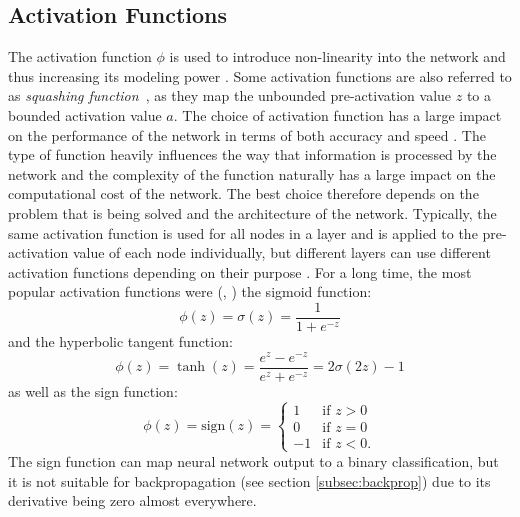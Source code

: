 \subsection{Activation Functions}
\label{subsec:activation-functions}
The activation function $\phi$ is used to introduce non-linearity into the network and thus increasing its modeling power \cite[section 1.2.1.3]{aggarwal_neural_2018}. 
Some activation functions are also referred to as \textit{squashing function}~\cite[10]{haykin_neural_1998}, as they map the unbounded pre-activation value $z$ to a bounded activation value $a$.
The choice of activation function has a large impact on the performance of the network in terms of both accuracy and speed \cite{dubey_activation_2022}.
The type of function heavily influences the way that information is processed by the network and the complexity of the function naturally has a large impact on the computational cost of the network.
The best choice therefore depends on the problem that is being solved and the architecture of the network.
Typically, the same activation function is used for all nodes in a layer and is applied to the pre-activation value of each node individually, but different layers can use different activation functions depending on their purpose \cite[174]{goodfellow_deep_2016}.
For a long time, the most popular activation functions were (\cite[chapter 6.3]{goodfellow_deep_2016}, \cite[section 1.2.1.3]{aggarwal_neural_2018}) the sigmoid function:
\begin{equation}
    \phi(z) = \sigma(z) = \frac{1}{1+e^{-z}}
    \label{eq:sigmoid}
\end{equation}
and the hyperbolic tangent function:
\begin{equation}
    \phi(z) = \tanh(z) = \frac{e^z - e^{-z}}{e^z + e^{-z}} = 2\sigma(2z) - 1
    \label{eq:tanh}
\end{equation}
as well as the sign function:
\begin{equation}
    \phi(z) = \text{sign}(z) = \begin{cases}
        1 & \text{if } z > 0 \\
        0 & \text{if } z = 0 \\
        -1 & \text{if } z < 0 \text{.}
    \end{cases}
    \label{eq:sign}
\end{equation}
The sign function can map neural network output to a binary classification, but it is not suitable for backpropagation (see section \ref{subsec:backprop}) due to its derivative being zero almost everywhere.
